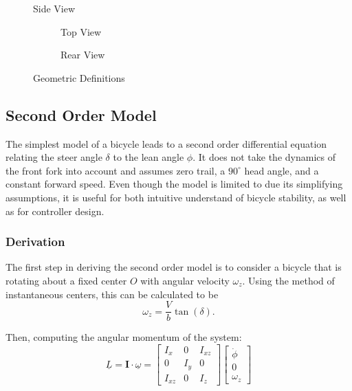 \begin{figure}[H]
	\centering
    \def\svgwidth{0.5\textwidth}
    
    \caption{Side View}
	\label{fig:geometry}
\end{figure}

\begin{figure}[H]
	\centering
	\begin{subfigure}[t]{0.4\textwidth}
		\centering
    	
    	\caption{Top View}
    \end{subfigure}
    \begin{subfigure}[t]{0.4\textwidth}
    	\centering
    	
    	\caption{Rear View}
    \end{subfigure}
    \caption{Geometric Definitions}
    \label{fig:geometry2}
\end{figure}

\subsection{Second Order Model}
The simplest model of a bicycle leads to a second order differential equation relating the steer angle $\delta$ to the lean angle $\phi$. It does not take the dynamics of the front fork into account and assumes zero trail, a $90^{\circ}$ head angle, and a constant forward speed. Even though the model is limited to due its simplifying assumptions, it is useful for both intuitive understand of bicycle stability, as well as for controller design.

\subsubsection{Derivation}
The first step in deriving the second order model is to consider a bicycle that is rotating about a fixed center $O$ with angular velocity $\omega_z$. Using the method of instantaneous centers, this can be calculated to be
\begin{equation*}
\omega_z = \frac{V}{b} \tan{(\delta)}.
\end{equation*}

Then, computing the angular momentum of the system:
\begin{equation*}
\underline{L} = \mathbf{I} \cdot \underline{\omega} = \begin{bmatrix}
I_x & 0 & I_{xz} \\
0 & I_y & 0 \\
I_{xz} & 0 & I_z
\end{bmatrix} \begin{bmatrix}
\dot{\phi} \\
0 \\
\omega_z
\end{bmatrix}
\end{equation*}

